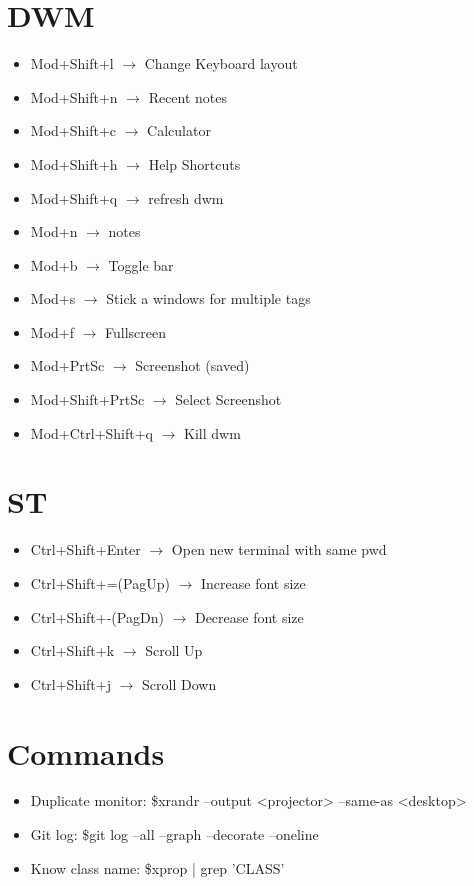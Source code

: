 \documentclass[a4paper,10pt]{article}
\begin{document}
\section{DWM}
\begin{itemize}
  \item Mod+Shift+l $\to$ Change Keyboard layout
  \item Mod+Shift+n $\to$ Recent notes
  \item Mod+Shift+c $\to$ Calculator
  \item Mod+Shift+h $\to$ Help Shortcuts
  \item Mod+Shift+q $\to$ refresh dwm
  \item Mod+n $\to$ notes
  \item Mod+b $\to$ Toggle bar
  \item Mod+s $\to$ Stick a windows for multiple tags
  \item Mod+f $\to$ Fullscreen
  \item Mod+PrtSc $\to$ Screenshot (saved)
  \item Mod+Shift+PrtSc $\to$ Select Screenshot
  \item Mod+Ctrl+Shift+q $\to$ Kill dwm
\end{itemize}

\section{ST}
\begin{itemize}
  \item Ctrl+Shift+Enter $\to$ Open new terminal with same pwd
  \item Ctrl+Shift+=(PagUp) $\to$ Increase font size
  \item Ctrl+Shift+-(PagDn) $\to$ Decrease font size
  \item Ctrl+Shift+k $\to$ Scroll Up
  \item Ctrl+Shift+j $\to$ Scroll Down
\end{itemize}
\section{Commands}
\begin{itemize}
  \item Duplicate monitor: \$xrandr --output <projector> --same-as <desktop>
  \item Git log: \$git log --all --graph --decorate --oneline
  \item Know class name: \$xprop | grep 'CLASS'
\end{itemize}
    \newpage
\end{document}
